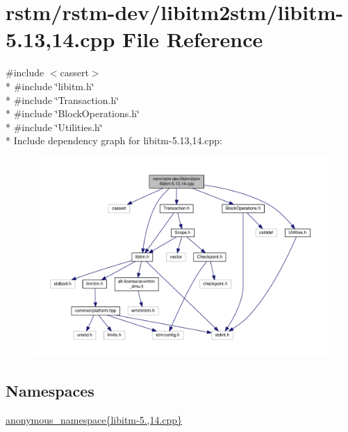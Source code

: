 \hypertarget{libitm-5_813_0014_8cpp}{\section{rstm/rstm-\/dev/libitm2stm/libitm-\/5.13,14.cpp File Reference}
\label{libitm-5_813_0014_8cpp}
}
{\ttfamily \#include $<$cassert$>$}\\*
{\ttfamily \#include \char`\"{}libitm.\-h\char`\"{}}\\*
{\ttfamily \#include \char`\"{}Transaction.\-h\char`\"{}}\\*
{\ttfamily \#include \char`\"{}Block\-Operations.\-h\char`\"{}}\\*
{\ttfamily \#include \char`\"{}Utilities.\-h\char`\"{}}\\*
Include dependency graph for libitm-\/5.13,14.cpp\-:
\nopagebreak
\begin{figure}[H]
\begin{center}
\leavevmode
\includegraphics[width=350pt]{libitm-5_813_0014_8cpp__incl}
\end{center}
\end{figure}
\subsection*{Namespaces}
\begin{DoxyCompactItemize}
\item 
\hyperlink{namespaceanonymous__namespace_02libitm-5_813_0014_8cpp_03}{anonymous\-\_\-namespace\{libitm-\/5.,14.\-cpp\}}
\end{DoxyCompactItemize}

